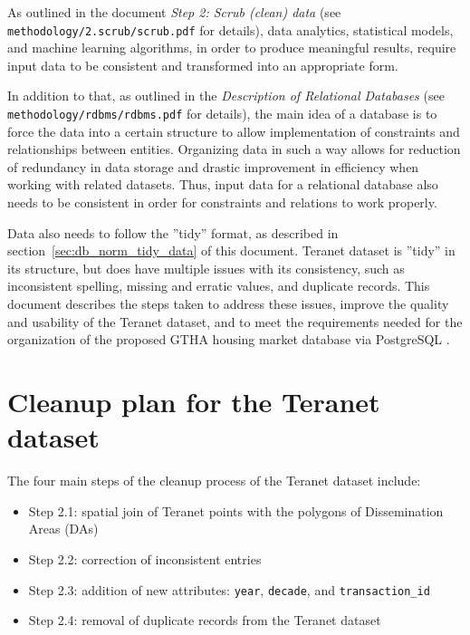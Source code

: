 \documentclass[11pt]{article}
\begin{document}
    \vspace{5mm}

    As outlined in the document \textit{Step 2: Scrub (clean) data} (see \\ \texttt{methodology/2.scrub/scrub.pdf} for details), data analytics, statistical models, and machine learning algorithms, in order to produce meaningful results, require input data to be consistent and transformed into an appropriate form.

    In addition to that, as outlined in the \textit{Description of Relational Databases} (see \texttt{methodology/rdbms/rdbms.pdf} for details), the main idea of a database is to force the data into a certain structure to allow implementation of constraints and relationships between entities.
    Organizing data in such a way allows for reduction of redundancy in data storage and drastic improvement in efficiency when working with related datasets.
    Thus, input data for a relational database also needs to be consistent in order for constraints and relations to work properly.

    Data also needs to follow the ''tidy'' format, as described in section~\ref{sec:db_norm_tidy_data} of this document.
    Teranet dataset is ''tidy'' in its structure, but does have multiple issues with its consistency, such as inconsistent spelling, missing and erratic values, and duplicate records.
    This document describes the steps taken to address these issues, improve the quality and usability of the Teranet dataset, and to meet the requirements needed for the organization of the proposed GTHA housing market database via PostgreSQL .

    \section{Cleanup plan for the Teranet dataset} \label{sec:teranet_cleanup_plan}

    The four main steps of the cleanup process of the Teranet dataset include:
    \begin{itemize}
        \item Step 2.1: spatial join of Teranet points with the polygons of Dissemination Areas (DAs)
        \item Step 2.2: correction of inconsistent entries
        \item Step 2.3: addition of new attributes: \texttt{year}, \texttt{decade}, and \texttt{transaction\_id}
        \item Step 2.4: removal of duplicate records from the Teranet dataset
    \end{itemize}
\end{document}
